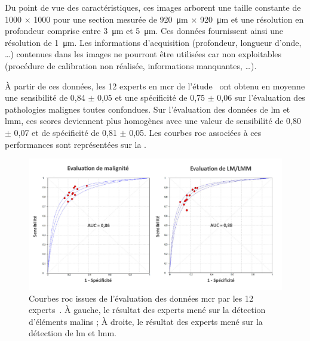 Du point de vue des caractéristiques, ces images arborent une taille constante de \SI{1000}{\px} $\times$ \SI{1000}{\px} pour une section mesurée de \SI{920}{\micro\metre} $\times$ \SI{920}{\micro\metre} et une résolution en profondeur comprise entre \SI{3}{\micro\metre} et \SI{5}{\micro\metre}. Ces données fournissent ainsi une résolution de \SI{1}{\micro\metre}. Les informations d'acquisition (profondeur, longueur d'onde, \ldots) contenues dans les images ne pourront être utilisées car non exploitables (procédure de calibration non réalisée, informations manquantes, \ldots).\par
\clearpage

À partir de ces données, les 12 experts en \gls{mcr} de l'étude~\cite{Cinotti2018} ont obtenu en moyenne une sensibilité de 0,84 $\pm$ 0,05 et une spécificité de 0,75 $\pm$ 0,06 sur l'évaluation des pathologies malignes toutes confondues. Sur l'évaluation des données de \gls{lm} et \gls{lmm}, ces scores deviennent plus homogènes avec une valeur de sensibilité de 0,80 $\pm$ 0,07 et de spécificité de 0,81 $\pm$ 0,05. Les courbes \gls{roc} associées à ces performances sont représentées sur la .\par

\begin{figure}[H]
    \begin{center}
        \includegraphics[width=\linewidth]{contents/ii_preamble_microscopy/resources/results_roc_rcm_experts.pdf}
        \caption{Courbes \gls{roc} issues de l'évaluation des données \gls{mcr} par les 12 experts~\cite{Cinotti2018}. À gauche, le résultat des experts mené sur la détection d'éléments malins ; À droite, le résultat des experts mené sur la détection de \gls{lm} et \gls{lmm}.}
        \label{fig:results_roc_rcm_experts}
    \end{center} 
\end{figure}\par


